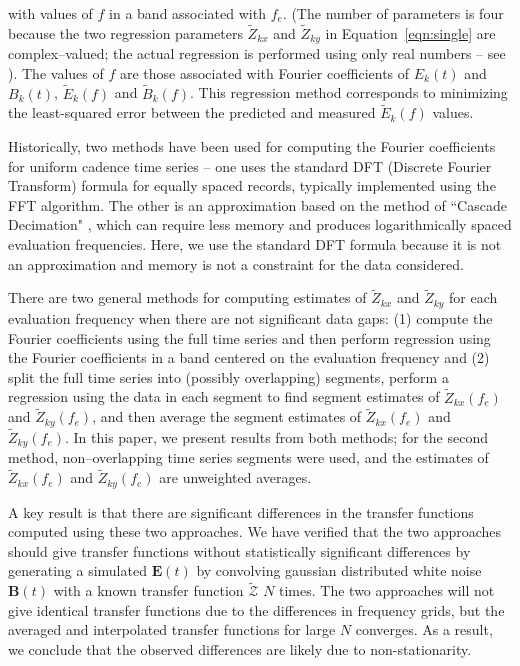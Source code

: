 \documentclass[pdflatex,sn-basic]{sn-jnl}%
\begin{document}
\noindent with values of $f$ in a band associated with $f_e$. (The number of parameters is four because the two regression parameters $\widetilde{Z}_{kx}$ and $\widetilde{Z}_{ky}$ in Equation~\ref{eqn:single} are complex--valued; the actual regression is performed using only real numbers -- see \cite{Egbert1986}). The values of $f$ are those associated with Fourier coefficients of $E_k(t)$ and $B_k(t)$, $\widetilde{E}_k(f)$ and $\widetilde{B}_k(f)$. This regression method corresponds to minimizing the least-squared error between the predicted and measured $\widetilde{E}_k(f)$ values.

Historically, two methods have been used for computing the Fourier coefficients for uniform cadence time series -- one uses the standard DFT (Discrete Fourier Transform) formula for equally spaced records, typically implemented using the FFT algorithm. The other is an approximation based on the method of ``Cascade Decimation" \citep{Wight1980}, which can require less memory and produces logarithmically spaced evaluation frequencies. Here, we use the standard DFT formula because it is not an approximation and memory is not a constraint for the data considered.

There are two general methods for computing estimates of $\widetilde{Z}_{kx}$ and $\widetilde{Z}_{ky}$ for each evaluation frequency when there are not significant data gaps: (1) compute the Fourier coefficients using the full time series and then perform regression using the Fourier coefficients in a band centered on the evaluation frequency and (2) split the full time series into (possibly overlapping) segments, perform a regression using the data in each segment to find segment estimates of $\widetilde{Z}_{kx}(f_e)$ and $\widetilde{Z}_{ky}(f_e)$, and then average the segment estimates of $\widetilde{Z}_{kx}(f_e)$ and $\widetilde{Z}_{ky}(f_e)$. In this paper, we present results from both methods; for the second method, non--overlapping time series segments were used, and the estimates of $\widetilde{Z}_{kx}(f_e)$ and $\widetilde{Z}_{ky}(f_e)$ are unweighted averages.

A key result is that there are significant differences in the transfer functions computed using these two approaches. We have verified that the two approaches should give transfer functions without statistically significant differences by generating a simulated $\mathbf{E}(t)$ by convolving gaussian distributed white noise $\mathbf{B}(t)$ with a known transfer function $\boldsymbol{\mathcal{\widetilde{Z}}}$ $N$ times. The two approaches will not give identical transfer functions due to the differences in frequency grids, but the averaged and interpolated transfer functions for large $N$ converges. As a result, we conclude that the observed differences are likely due to non-stationarity.
\end{document}
